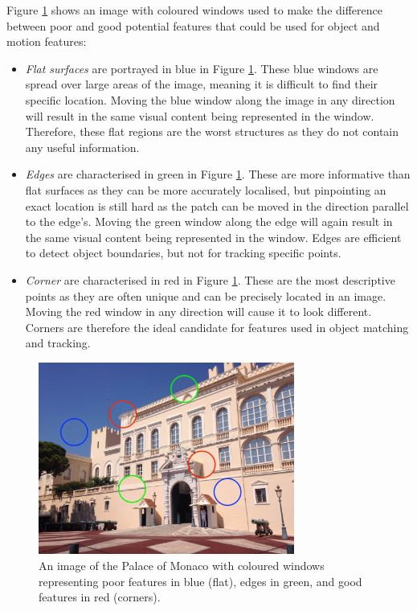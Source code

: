 Figure \ref{fig:monaco_palace_features} shows an image with coloured windows used to make the difference between poor and good potential features that could be used for object and motion features:
\begin{itemize}
	\item \textit{Flat surfaces} are portrayed in blue in Figure \ref{fig:monaco_palace_features}. These blue windows are spread over large areas of the image, meaning it is difficult to find their specific location. Moving the blue window along the image in any direction will result in the same visual content being represented in the window. Therefore, these flat regions are the worst structures as they do not contain any useful information.
	\item \textit{Edges} are characterised in green in Figure \ref{fig:monaco_palace_features}. These are more informative than flat surfaces as they can be more accurately localised, but pinpointing an exact location is still hard as the patch can be moved in the direction parallel to the edge's. Moving the green window along the edge will again result in the same visual content being represented in the window. Edges are efficient to detect object boundaries, but not for tracking specific points.
	\item \textit{Corner} are characterised in red in Figure \ref{fig:monaco_palace_features}. These are the most descriptive points as they are often unique and can be precisely located in an image. Moving the red window in any direction will cause it to look different. Corners are therefore the ideal candidate for features used in object matching and tracking.
\end{itemize}

\begin{figure}[h]
\centerline{\includegraphics[width=0.75\textwidth]{figures/monaco_palace_features.jpg}}
\caption{\label{fig:monaco_palace_features}An image of the Palace of Monaco with coloured windows representing poor features in blue (flat), edges in green, and good features in red (corners).}
\end{figure}


